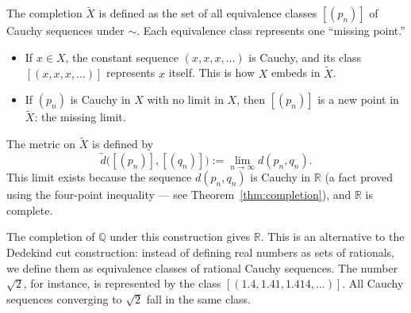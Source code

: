 \begin{remark*}
The completion $\widetilde{X}$ is defined as the set of all equivalence classes
$[(p_n)]$ of Cauchy sequences under $\sim$.
Each equivalence class represents one ``missing point.''

\begin{itemize}
  \item If $x \in X$, the constant sequence $(x, x, x, \ldots)$ is Cauchy, and
        its class $[(x,x,x,\ldots)]$ represents $x$ itself.
        This is how $X$ embeds in $\widetilde{X}$.
  \item If $(p_n)$ is Cauchy in $X$ with no limit in $X$, then
        $[(p_n)]$ is a new point in $\widetilde{X}$: the missing limit.
\end{itemize}

The metric on $\widetilde{X}$ is defined by
\[
\widetilde{d}\bigl([(p_n)], [(q_n)]\bigr) := \lim_{n \to \infty} d(p_n, q_n).
\]
This limit exists because the sequence $d(p_n, q_n)$ is Cauchy in $\mathbb{R}$
(a fact proved using the four-point inequality --- see Theorem~\ref{thm:completion}),
and $\mathbb{R}$ is complete.
\end{remark*}

\begin{remark*}
The completion of $\mathbb{Q}$ under this construction gives $\mathbb{R}$.
This is an alternative to the Dedekind cut construction:
instead of defining real numbers as sets of rationals,
we define them as equivalence classes of rational Cauchy sequences.
The number $\sqrt{2}$, for instance, is represented by the class
$[(1.4, 1.41, 1.414, \ldots)]$.
All Cauchy sequences converging to $\sqrt{2}$ fall in the same class.
\end{remark*}
